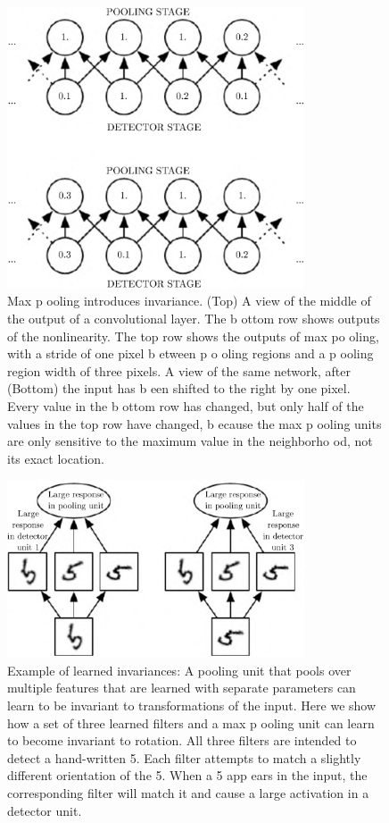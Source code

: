 \documentclass{report}
\begin{document}
\begin{figure}[ht]
	\includegraphics[width=250pt]{47}
	\centering
	\caption{Max p ooling introduces invariance. (Top) A view of the middle of the output of a convolutional layer. The b ottom row shows outputs of the nonlinearity. The top row shows the outputs of max po oling, with a stride of one pixel b etween p o oling regions and a p ooling region width of three pixels. A view of the same network, after (Bottom) the input has b een shifted to the right by one pixel. Every value in the b ottom row has changed, but only half of the values in the top row have changed, b ecause the max p ooling units are only sensitive to the maximum value in the neighborho od, not its exact location.}
\end{figure}

\begin{figure}[ht]
	\includegraphics[width=250pt]{48}
	\centering
	\caption{Example of learned invariances: A pooling unit that pools over multiple features that are learned with separate parameters can learn to be invariant to transformations of the input. Here we show how a set of three learned filters and a max p ooling unit can learn to become invariant to rotation. All three filters are intended to detect a hand-written 5. Each filter attempts to match a slightly different orientation of the 5. When a 5 app ears in the input, the corresponding filter will match it and cause a large activation in a detector unit.}
\end{figure}
\end{document}
